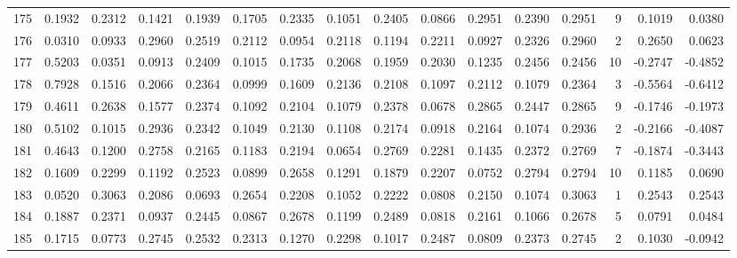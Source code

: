 \begin{tabular}{lrrrrrrrrrrrrrrr}
175 &      0.1932 &  0.2312 &  0.1421 &  0.1939 &  0.1705 &  0.2335 &  0.1051 &  0.2405 &  0.0866 &  0.2951 &   0.2390 &     0.2951 &      9 &                    0.1019 &                     0.0380 \\
176 &      0.0310 &  0.0933 &  0.2960 &  0.2519 &  0.2112 &  0.0954 &  0.2118 &  0.1194 &  0.2211 &  0.0927 &   0.2326 &     0.2960 &      2 &                    0.2650 &                     0.0623 \\
177 &      0.5203 &  0.0351 &  0.0913 &  0.2409 &  0.1015 &  0.1735 &  0.2068 &  0.1959 &  0.2030 &  0.1235 &   0.2456 &     0.2456 &     10 &                   -0.2747 &                    -0.4852 \\
178 &      0.7928 &  0.1516 &  0.2066 &  0.2364 &  0.0999 &  0.1609 &  0.2136 &  0.2108 &  0.1097 &  0.2112 &   0.1079 &     0.2364 &      3 &                   -0.5564 &                    -0.6412 \\
179 &      0.4611 &  0.2638 &  0.1577 &  0.2374 &  0.1092 &  0.2104 &  0.1079 &  0.2378 &  0.0678 &  0.2865 &   0.2447 &     0.2865 &      9 &                   -0.1746 &                    -0.1973 \\
180 &      0.5102 &  0.1015 &  0.2936 &  0.2342 &  0.1049 &  0.2130 &  0.1108 &  0.2174 &  0.0918 &  0.2164 &   0.1074 &     0.2936 &      2 &                   -0.2166 &                    -0.4087 \\
181 &      0.4643 &  0.1200 &  0.2758 &  0.2165 &  0.1183 &  0.2194 &  0.0654 &  0.2769 &  0.2281 &  0.1435 &   0.2372 &     0.2769 &      7 &                   -0.1874 &                    -0.3443 \\
182 &      0.1609 &  0.2299 &  0.1192 &  0.2523 &  0.0899 &  0.2658 &  0.1291 &  0.1879 &  0.2207 &  0.0752 &   0.2794 &     0.2794 &     10 &                    0.1185 &                     0.0690 \\
183 &      0.0520 &  0.3063 &  0.2086 &  0.0693 &  0.2654 &  0.2208 &  0.1052 &  0.2222 &  0.0808 &  0.2150 &   0.1074 &     0.3063 &      1 &                    0.2543 &                     0.2543 \\
184 &      0.1887 &  0.2371 &  0.0937 &  0.2445 &  0.0867 &  0.2678 &  0.1199 &  0.2489 &  0.0818 &  0.2161 &   0.1066 &     0.2678 &      5 &                    0.0791 &                     0.0484 \\
185 &      0.1715 &  0.0773 &  0.2745 &  0.2532 &  0.2313 &  0.1270 &  0.2298 &  0.1017 &  0.2487 &  0.0809 &   0.2373 &     0.2745 &      2 &                    0.1030 &                    -0.0942 \\

\end{tabular}
